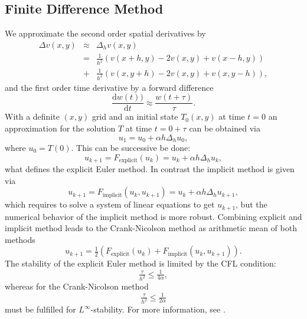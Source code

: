 \documentclass[a4paper,11pt]{article}
\begin{document}
\subsection{Finite Difference Method}
We approximate the second order spatial derivatives by
\begin{eqnarray*}
\Delta v(x,y) & \approx & \Delta_h v(x,y) \\
 & = & \frac{1}{h^2}\left(v(x+h, y) -2 v(x,y) + v(x-h,y) \right) \\
& + & \frac{1}{h^2}\left( v(x, y+h) -2 v(x,y) + v(x,y-h) \right),
\end{eqnarray*}
and the first order time derivative by a forward difference
\begin{equation*}
\frac{\mathrm{d} w(t) )}{\mathrm{d} t } \approx \frac{w(t+\tau )}{\tau } .
\end{equation*}
With a definite $(x,y)$ grid and an initial state $T_0 (x,y) $ at time $t=0$ an approximation for the solution $T$ at time $t= 0 +\tau $ can be obtained via
\begin{equation*}
u_1 = u_0 + \alpha h\Delta_h u_0,
\end{equation*}
where $ u_0 = T(0) $. This can be successive be done:
\begin{equation*}
u_{k+1} = F_{\mathrm{explicit}} (u_k) = u_k + \alpha h \Delta_h u_k,
\end{equation*}
what defines the explicit Euler method. In contrast the implicit method is given via
\begin{equation*}
u_{k+1} = F_{\mathrm{implicit}} (u_k, u_{k+1}) =u_k + \alpha h \Delta_h u_{k+1},
\end{equation*}
which requires to solve a system of linear equations to get $u_{k+1} $, but the numerical behavior of the implicit method is more robust.
Combining explicit and implicit method leads to the Crank-Nicolson method as arithmetic mean of both methods
\begin{equation*}
u_{k+1} = \tfrac{1}{2}\left(  F_{\mathrm{explicit}} (u_k)  + F_{\mathrm{implicit}} (u_k, u_{k+1})  \right) .
\end{equation*}
The stability of the explicit Euler method is limited by the CFL condition:
\begin{equation*}
\tfrac{\tau }{h^2 } \leq \tfrac{1}{4\alpha }, 
\end{equation*}
whereas for the Crank-Nicolson method
\begin{equation*}
\tfrac{\tau }{h^2 } \leq \tfrac{1}{2\alpha }
\end{equation*}
must be fulfilled for $L^\infty $-stability. For more information, see \cite[p 112]{Ernst2015}.
\end{document}
